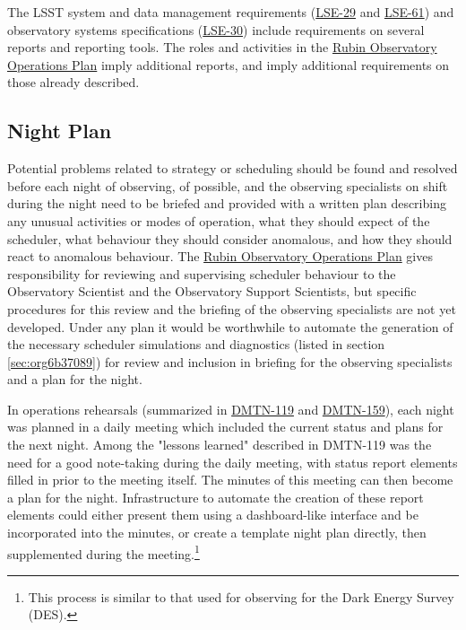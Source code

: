 The LSST system and data management requirements (\href{https://ls.st/lse-29}{LSE-29} and \href{https://ls.st/lse-61}{LSE-61}) and observatory systems specifications (\href{https://ls.st/lse-30}{LSE-30}) include requirements on several reports and reporting tools. The roles and activities in the \href{https://docushare.lsst.org/docushare/dsweb/Get/Document-36797/Rubin\%20Observatory\%20Operations\%20Plan\%20April\%202020.pdf}{Rubin Observatory Operations Plan} imply additional reports, and imply additional requirements on those already described.

\subsection{Night Plan}
\label{sec:org747955a}

Potential problems related to strategy or scheduling should be found and resolved before each night of observing, of possible, and the observing specialists on shift during the night need to be briefed and provided with a written plan describing any unusual activities or modes of operation, what they should expect of the scheduler, what behaviour they should consider anomalous, and how they should react to anomalous behaviour.
The \href{https://docushare.lsst.org/docushare/dsweb/Get/Document-36797/Rubin\%20Observatory\%20Operations\%20Plan\%20April\%202020.pdf}{Rubin Observatory Operations Plan} gives responsibility for reviewing and supervising scheduler behaviour to the Observatory Scientist and the Observatory Support Scientists, but specific procedures for this review and the briefing of the observing specialists are not yet developed.
Under any plan it would be worthwhile to automate the generation of the necessary scheduler simulations and diagnostics (listed in section \ref{sec:org6b37089}) for review and inclusion in briefing for the observing specialists and a plan for the night.

In operations rehearsals (summarized in \href{https://dmtn-119.lsst.io}{DMTN-119} and \href{https://dmtn-159.lsst.io/}{DMTN-159}), each night was planned in a daily meeting which included the current status and plans for the next night.
Among the "lessons learned" described in DMTN-119 was the need for a good note-taking during the daily meeting, with status report elements filled in prior to the meeting itself. 
The minutes of this meeting can then become a plan for the night.
Infrastructure to automate the creation of these report elements could either present them using a dashboard-like interface and be incorporated into the minutes, or create a template night plan directly, then supplemented during the meeting.\footnote{This process is similar to that used for observing for the Dark Energy Survey (DES).}

